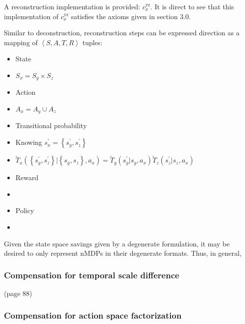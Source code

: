 \documentclass[compsoc,journal,letterpaper,10pt,draftclsnofoot,onecolumn]{IEEEtran}
\begin{document}
 
\label{example-nauxefve-reconstruction}

A reconstruction implementation is provided: \(c_{x}^{\text{yz}}\). It
is direct to see that this implementation of \(c_{x}^{\text{yz}}\)
satisfies the axioms given in section 3.0.

Similar to deconstruction, reconstruction steps can be expressed
direction as a mapping of \(\left\langle S,A,T,R \right\rangle\) tuples:

\begin{itemize}
\item
  State
\item
  \(S_{x} = S_{y} \times S_{z}\)
\item
  Action
\item
  \(A_{x} = A_{y} \cup A_{z}\)
\item
  Transitional probability
\item
  Knowing \(s_{x}^{'} = \left\{ s_{y}^{'},s_{z}^{'} \right\}\)
\item
  \({\tilde{T}}_{x}\left( \left\{ s_{y}^{'},s_{z}^{'} \right\}|\left\{ s_{y}^{\ },s_{z}^{\ } \right\},a_{x} \right) = {\tilde{T}}_{y}\left( s_{y}^{'}|s_{y}^{\ },a_{x} \right){\tilde{T}}_{z}\left( s_{z}^{'}|s_{z}^{\ },a_{x} \right)\)
\item
  Reward
\item
\item
  Policy
\item
\end{itemize} 

\label{concurrency-and-re-mapping}

Given the state space savings given by a degenerate formulation, it may
be desired to only represent nMDPs in their degenerate formats. Thus, in
general,

\subsubsection{Compensation for temporal scale
difference}\label{compensation-for-temporal-scale-difference}

(page 88)

\subsubsection{Compensation for action space
factorization}\label{compensation-for-action-space-factorization}
\end{document}
